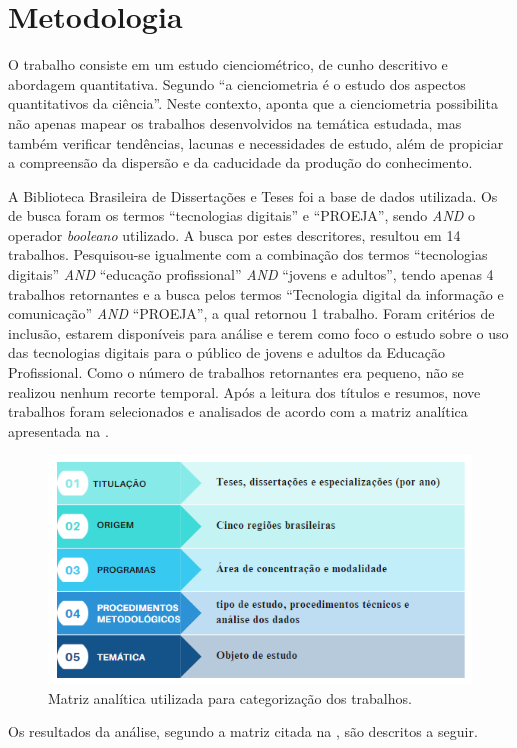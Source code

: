 \section{Metodologia}\label{sec-metodologia}

O trabalho consiste em um estudo cienciométrico, de cunho descritivo e
abordagem quantitativa. Segundo \textcite{Macias-chapula1998} ``a cienciometria
é o estudo dos aspectos quantitativos da ciência''. Neste contexto,
\textcite{spinak1998} aponta que a cienciometria possibilita não apenas mapear
os trabalhos desenvolvidos na temática estudada, mas também verificar
tendências, lacunas e necessidades de estudo, além de propiciar a
compreensão da dispersão e da caducidade da produção do conhecimento.

A Biblioteca Brasileira de Dissertações e Teses foi a base de dados
utilizada. Os de busca foram os termos ``tecnologias digitais'' e
``PROEJA'', sendo \emph{AND} o operador \emph{booleano} utilizado. A
busca por estes descritores, resultou em 14 trabalhos. Pesquisou-se
igualmente com a combinação dos termos ``tecnologias digitais''
\emph{AND} ``educação profissional'' \emph{AND} ``jovens e adultos'',
tendo apenas 4 trabalhos retornantes e a busca pelos termos ``Tecnologia
digital da informação e comunicação'' \emph{AND} ``PROEJA'', a qual
retornou 1 trabalho. Foram critérios de inclusão, estarem disponíveis
para análise e terem como foco o estudo sobre o uso das tecnologias
digitais para o público de jovens e adultos da Educação Profissional.
Como o número de trabalhos retornantes era pequeno, não se realizou
nenhum recorte temporal. Após a leitura dos títulos e resumos, nove
trabalhos foram selecionados e analisados de acordo com a matriz
analítica apresentada na .


\begin{figure}[htpb]
\centering
\begin{minipage}{.5\textwidth}
\caption{Matriz analítica utilizada para categorização dos trabalhos.}\label{fig1}
\includegraphics[width=\textwidth]{Fig1.png}
\end{minipage}
\end{figure}


Os resultados da análise, segundo a matriz citada na , são
descritos a seguir.